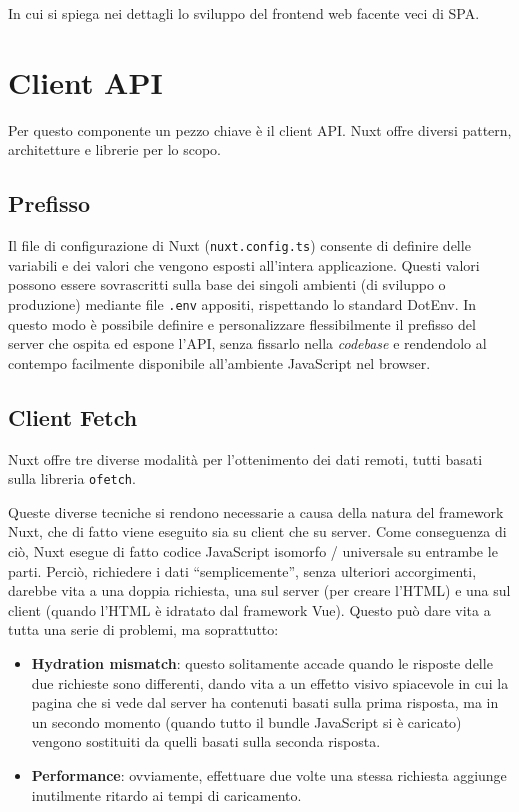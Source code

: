 In cui si spiega nei dettagli lo sviluppo del frontend web facente veci di SPA.

\section{Client API}
Per questo componente un pezzo chiave è il client API. Nuxt offre diversi pattern, architetture e librerie per lo scopo.

\subsection{Prefisso}
Il file di configurazione di Nuxt (\texttt{nuxt.config.ts}) consente di definire delle variabili e dei valori che vengono esposti all'intera applicazione.
Questi valori possono essere sovrascritti sulla base dei singoli ambienti (di sviluppo o produzione) mediante file \texttt{.env} appositi, rispettando lo standard DotEnv.
In questo modo è possibile definire e personalizzare flessibilmente il prefisso del server che ospita ed espone l'API, senza fissarlo nella \emph{codebase} e rendendolo al contempo facilmente disponibile all'ambiente JavaScript nel browser.

\subsection{Client Fetch}
Nuxt offre tre diverse modalità per l'ottenimento dei dati remoti, tutti basati sulla libreria \texttt{ofetch}.

Queste diverse tecniche si rendono necessarie a causa della natura del framework Nuxt, che di fatto viene eseguito sia su client che su server. Come conseguenza di ciò, Nuxt esegue di fatto codice JavaScript isomorfo / universale su entrambe le parti. Perciò, richiedere i dati ``semplicemente'', senza ulteriori accorgimenti, darebbe vita a una doppia richiesta, una sul server (per creare l'HTML) e una sul client (quando l'HTML è idratato dal framework Vue). Questo può dare vita a tutta una serie di problemi, ma soprattutto:
\begin{itemize}
    \item \textbf{Hydration mismatch}: questo solitamente accade quando le risposte delle due richieste sono differenti, dando vita a un effetto visivo spiacevole in cui la pagina che si vede dal server ha contenuti basati sulla prima risposta, ma in un secondo momento (quando tutto il bundle JavaScript si è caricato) vengono sostituiti da quelli basati sulla seconda risposta.
    \item \textbf{Performance}: ovviamente, effettuare due volte una stessa richiesta aggiunge inutilmente ritardo ai tempi di caricamento.
\end{itemize}


